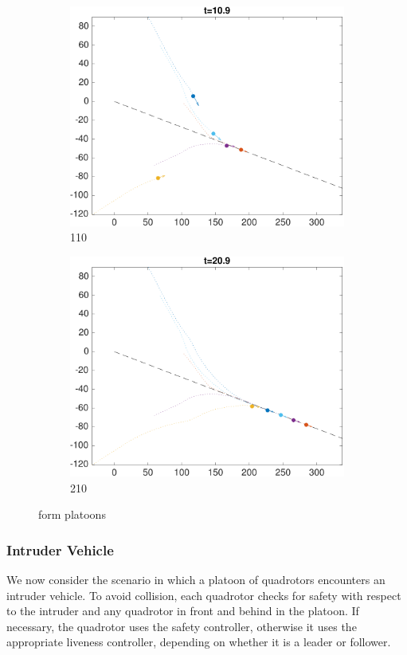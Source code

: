 \begin{figure}
    \begin{subfigure}{0.23\textwidth} \label{subfig:fp_110}
        \includegraphics[width=\textwidth]{fig/fp_110}
        \caption{110}
    \end{subfigure}
    \begin{subfigure}{0.23\textwidth} \label{subfig:fp_210}
        \includegraphics[width=\textwidth]{fig/fp_210}
        \caption{210}
    \end{subfigure}   
    \caption{form platoons}    
\end{figure}

\subsubsection{Intruder Vehicle}
We now consider the scenario in which a platoon of quadrotors encounters an intruder vehicle. To avoid collision, each quadrotor checks for safety with respect to the intruder and any quadrotor in front and behind in the platoon. If necessary, the quadrotor uses the safety controller, otherwise it uses the appropriate liveness controller, depending on whether it is a leader or follower.

